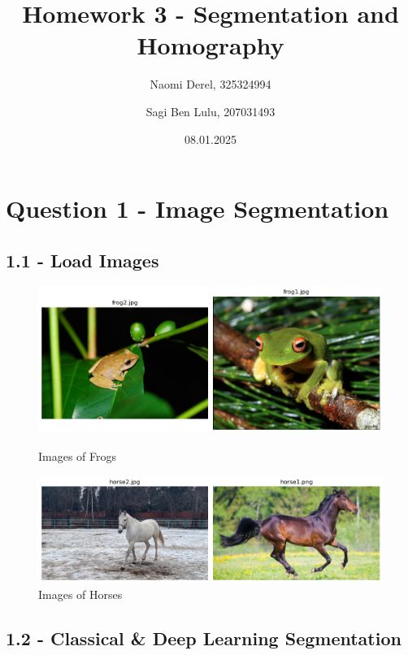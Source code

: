 \documentclass{article}
\title{Homework 3 - Segmentation and Homography}
\author{Naomi Derel, 325324994 
\and Sagi Ben Lulu, 207031493}
\date{08.01.2025}
\begin{document}
\maketitle

\section*{Question 1 - Image Segmentation}

\subsection*{1.1 - Load Images}

\begin{figure}[h!]
    \centering
    \begin{minipage}{0.45\textwidth}
        \centering
        \includegraphics[width=\textwidth]{../output/1.1_frog.png}
        \caption{Images of Frogs}
        \label{fig:1_1_frog}
    \end{minipage}
    \hfill
    \begin{minipage}{0.5\textwidth}
        \centering
        \includegraphics[width=\textwidth]{../output/1.1_horse.png}
        \caption{Images of Horses}
        \label{fig:1_1_horse}
    \end{minipage}
\end{figure}

\subsection*{1.2 - Classical \& Deep Learning Segmentation}
\end{document}
